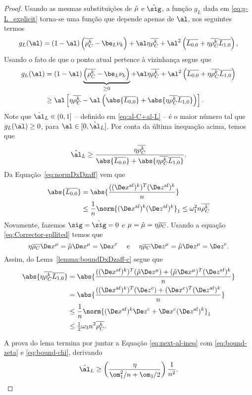 \begin{proof}

Usando as mesmas substituições de $\hat{\mu}$ e $\nextsig$, a função $g_L$ dada em \eqref{eq:g-L_explicit} torna-se uma função que depende apenas de $\al$, nos seguintes termos 
\[
g_L(\al) =     (1-\al)\left(\dbvec{\rho_C^k } -  \be_L \nu_k   \right) +  \al\eta\dbvec{\rho_C^k } + 
   \al^2\left( \dbvec{L_{0,0}} + \eta\dbvec{\rho_C^k }  \dbvec{L_{1,0}}   \right ) ,
	\]
Usando  o fato de que o ponto atual pertence à  vizinhança segue que 
 \[
\begin{aligned}
{g}_L(\al) & =     (1-\al)\underbrace{\left(\dbvec{\rho_C^k } -  \be_L \nu_k   \right)}_{\geq 0} +  \al\eta\dbvec{\rho_C^k } + 
   \al^2\left( \dbvec{L_{0,0}} + \eta\dbvec{\rho_C^k }  \dbvec{L_{1,0}}   \right ) \\
   & \geq  \al\left[\eta\dbvec{\rho_C^k } - 
   \al \left(\abs{\dbvec{L_{0,0}}} + \abs{\eta\dbvec{\rho_C^k }  \dbvec{L_{1,0}}}\right)   \right ].
\end{aligned}
 \]
Note que  $\nextal_L\in(0,1]$ -- definido em \eqref{eq:al-C+al-L} -- é o maior número tal que  $g_L(\al)\geq 0$, para  $\al\in[0,\nextal_L]$. Por conta da última inequação acima, temos que 
\begin{equation}
	\label{eq:next-al-ineq}
\nextal_L \geq \frac{\eta\dbvec{\rho_C^k } }{\abs{\dbvec{L_{0,0}}} + \abs{\eta\dbvec{\rho_C^k }  \dbvec{L_{1,0}}}}.
\end{equation}
Da Equação~\eqref{eq:normDxDzaff}  vem que  
\begin{align}
\abs{\dbvec{L_{0,0}}} &  = \abs{\dfrac{( \dekx )^T \dekz }{n}} \notag \\
			& \leq \dfrac{1}{n} \norm{ \dekx  \dekz }_1  \leq  \omega_1^{2} n\dbvec{\rho_C^k }\label{eq:bound-zeta}
\end{align}
Novamente, fazemos $\sig = \nextsig=0$ e  $\mu=\hat{\mu} = \eta\overline{\rho_{C}}$. Usando a equação \eqref{eq:Corrector-spllited} temos que 
	\[
		\eta\dbvec{\rho_{C}}\Dex^\mu =  \nextmu\Dex^\mu = \Decox   \quad \text{ e } \quad \eta\dbvec{\rho_{C}}\Dez^\mu=  \nextmu\Dez^\mu=  \Decoz .
	\]
	Assim, do Lema~\ref{lemma:boundDxDzaff-c} segue que
	\begin{align}
	\abs{\eta\dbvec{\rho_C^k } \dbvec{L_{1,0}}} & = \abs{\dfrac{( \dekx )^T(\nextmu\Dez^\mu) + (\nextmu\Dex^\mu)^T \dekz }{n}   }  \notag \\ 
	&  = \abs{\dfrac{( \dekx )^T(\Decoz) + (\Decox)^T \dekz }{n} } \notag \\
	& \leq \dfrac{1}{n} \norm{ \dekx \Decoz + \Decox \dekz }_1 \notag\\
	&\leq \tfrac{1}{2}\omega_{3}n^{2}\dbvec{\rho_C^k }.\label{eq:bound-chi}
	\end{align}

A prova do lema termina por juntar a Equação \eqref{eq:next-al-ineq} com \eqref{eq:bound-zeta} e \eqref{eq:bound-chi}, derivando 
\[
\nextal_L \geq \left( \frac{\eta }{\om_{1}^{2}/n + \om_{3}/2}\right)\dfrac{1}{n^{2}}. \qedhere
\]
\end{proof}


